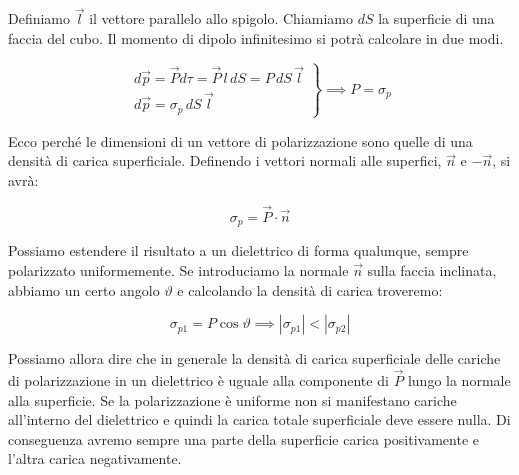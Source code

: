Definiamo $\vec{l}$ il vettore parallelo allo spigolo. Chiamiamo $dS$ la superficie di una faccia del cubo. Il momento di dipolo infinitesimo si potrà calcolare in due modi.

\[
	\left. \begin{array}{r}
	 	d\vec{p} = \vec{P} d\tau = \vec{P} \,l\,dS = P\,dS\,\vec{l} \\
		d\vec{p} = \sigma_p\,dS\,\vec{l}
	\end{array} \right\} \implies P = \sigma_p
\]

Ecco perché le dimensioni di un vettore di polarizzazione sono quelle di una densità di carica superficiale.
Definendo i vettori normali alle superfici, $\vec{n}$ e $-\vec{n}$, si avrà:

\[
	\boxed{\sigma_p = \vec{P} \cdot \vec{n}}
\]

Possiamo estendere il risultato a un dielettrico di forma qualunque, sempre polarizzato uniformemente. Se introduciamo la normale $\vec{n}$ sulla faccia inclinata, abbiamo un certo angolo $\vartheta$ e calcolando la densità di carica troveremo:

\[
	\sigma_{p1} = P \cos \vartheta \implies |\sigma_{p1}| < |\sigma_{p2} |
\]

Possiamo allora dire che in generale la densità di carica superficiale delle cariche di polarizzazione in un dielettrico è uguale alla componente di $\vec{P}$ lungo la normale alla superficie. Se la polarizzazione è uniforme non si manifestano cariche all'interno del dielettrico e quindi la carica totale superficiale deve essere nulla. Di conseguenza avremo sempre una parte della superficie carica positivamente e l'altra carica negativamente.

